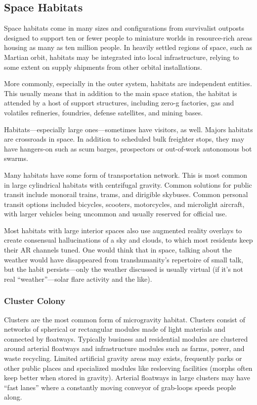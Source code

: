 \subsection{Space Habitats} 

Space habitats come in many sizes and configurations from survivalist outposts designed to support ten or fewer people to miniature worlds in resource-rich areas housing as many as ten million people. In heavily settled regions of space, such as Martian orbit, habitats may be integrated into local infrastructure, relying to some extent on supply shipments from other orbital installations. 

More commonly, especially in the outer system, habitats are independent entities. This usually means that in addition to the main space station, the habitat is attended by a host of support structures, including zero-g factories, gas and volatiles refineries, foundries, defense satellites, and mining bases. 

Habitats—especially large ones—sometimes have visitors, as well. Majors habitats are crossroads in space. In addition to scheduled bulk freighter stops, they may have hangers-on such as scum barges, prospectors or out-of-work autonomous bot swarms. 

Many habitats have some form of transportation network. This is most common in large cylindrical habitats with centrifugal gravity. Common solutions for public transit include monorail trains, trams, and dirigible skybuses. Common personal transit options included bicycles, scooters, motorcycles, and microlight aircraft, with larger vehicles being uncommon and usually reserved for official use. 

Most habitats with large interior spaces also use augmented reality overlays to create consensual hallucinations of a sky and clouds, to which most residents keep their AR channels tuned. One would think that in space, talking about the weather would have disappeared from transhumanity's repertoire of small talk, but the habit persists—only the weather discussed is usually virtual (if it's not real ``weather''—solar flare activity and the like). 

\subsubsection{Cluster Colony} 

Clusters are the most common form of microgravity habitat. Clusters consist of networks of spherical or rectangular modules made of light materials and connected by floatways. Typically business and residential modules are clustered around arterial floatways and infrastructure modules such as farms, power, and waste recycling. Limited artificial gravity areas may exists, frequently parks or other public places and specialized modules like resleeving facilities (morphs often keep better when stored in gravity). Arterial floatways in large clusters may have ``fast lanes'' where a constantly moving conveyor of grab-loops speeds people along. 



